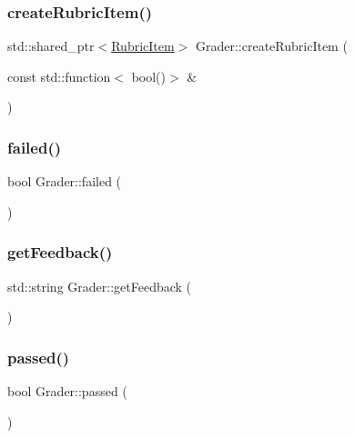 \subsubsection{\texorpdfstring{create\+Rubric\+Item()}{createRubricItem()}\hspace{0.1cm}{\footnotesize\ttfamily [3/3]}}
{\footnotesize\ttfamily std\+::shared\+\_\+ptr$<$\hyperlink{class_rubric_item}{Rubric\+Item}$>$ Grader\+::create\+Rubric\+Item (\begin{DoxyParamCaption}\item[{const std\+::function$<$ bool()$>$ \&}]{ }\end{DoxyParamCaption})}

\hypertarget{class_grader_acac97fc41ff9582c6bcb167f7537ee08}{}\label{class_grader_acac97fc41ff9582c6bcb167f7537ee08} 
\subsubsection{\texorpdfstring{failed()}{failed()}}
{\footnotesize\ttfamily bool Grader\+::failed (\begin{DoxyParamCaption}{ }\end{DoxyParamCaption})}

\hypertarget{class_grader_afb5d0bcb78bb58b3ffcad2cd77ef9610}{}\label{class_grader_afb5d0bcb78bb58b3ffcad2cd77ef9610} 
\subsubsection{\texorpdfstring{get\+Feedback()}{getFeedback()}}
{\footnotesize\ttfamily std\+::string Grader\+::get\+Feedback (\begin{DoxyParamCaption}{ }\end{DoxyParamCaption})}

\hypertarget{class_grader_a478a74aee440cdd28c9d8c67bcf3fde1}{}\label{class_grader_a478a74aee440cdd28c9d8c67bcf3fde1} 
\subsubsection{\texorpdfstring{passed()}{passed()}}
{\footnotesize\ttfamily bool Grader\+::passed (\begin{DoxyParamCaption}{ }\end{DoxyParamCaption})}

